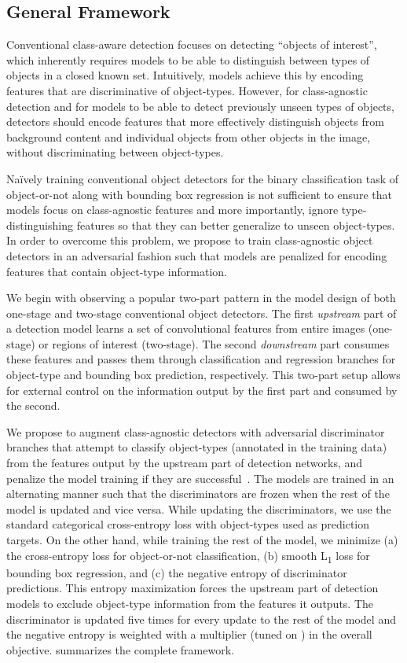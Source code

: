 \documentclass[10pt,twocolumn,letterpaper]{article}
\begin{document}
\subsection{General Framework}

Conventional class-aware detection focuses on detecting ``objects of interest'', which inherently requires models to be able to distinguish between types of objects in a closed known set. Intuitively, models achieve this by encoding features that are discriminative of object-types. However, for class-agnostic detection and for models to be able to detect previously unseen types of objects, detectors should encode features that more effectively distinguish objects from background content and individual objects from other objects in the image, without discriminating between object-types.

Na\"ively training conventional object detectors for the binary classification task of object-or-not along with bounding box regression is not sufficient to ensure that models focus on class-agnostic features and more importantly, ignore type-distinguishing features so that they can better generalize to unseen object-types. In order to overcome this problem, we propose to train class-agnostic object detectors in an adversarial fashion such that models are penalized for encoding features that contain object-type information.

We begin with observing a popular two-part pattern in the model design of both one-stage and two-stage conventional object detectors. The first \textit{upstream} part of a detection model learns a set of convolutional features from entire images (one-stage) or regions of interest (two-stage). The second \textit{downstream} part consumes these features and passes them through classification and regression branches for object-type and bounding box prediction, respectively. This two-part setup allows for external control on the information output by the first part and consumed by the second.

We propose to augment class-agnostic detectors with adversarial discriminator branches that attempt to classify object-types (annotated in the training data) from the features output by the upstream part of detection networks, and penalize the model training if they are successful~\cite{bib:uai,bib:unifai,bib:ropad,bib:advforget}. The models are trained in an alternating manner such that the discriminators are frozen when the rest of the model is updated and vice versa. While updating the discriminators, we use the standard categorical cross-entropy loss with object-types used as prediction targets. On the other hand, while training the rest of the model, we minimize (a) the cross-entropy loss for object-or-not classification, (b) smooth L\textsubscript{1} loss for bounding box regression, and (c) the negative entropy of discriminator predictions. This entropy maximization forces the upstream part of detection models to exclude object-type information from the features it outputs. The discriminator is updated five times for every update to the rest of the model and the negative entropy is weighted with a multiplier  (tuned on ) in the overall objective.  summarizes the complete framework.
\end{document}
